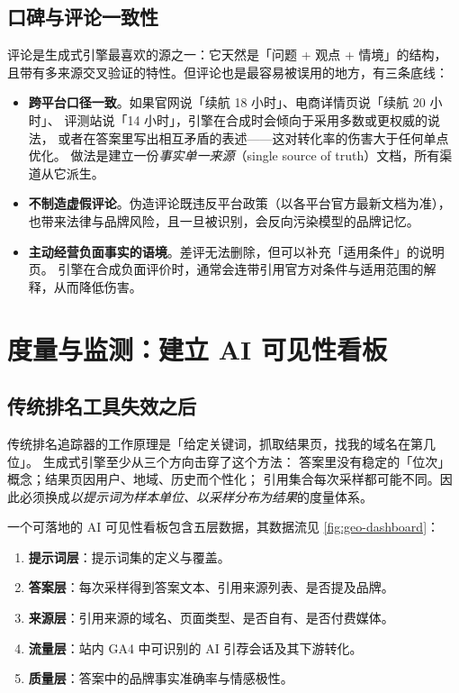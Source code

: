\subsection{口碑与评论一致性}

评论是生成式引擎最喜欢的源之一：它天然是「问题 + 观点 + 情境」的结构，
且带有多来源交叉验证的特性。但评论也是最容易被误用的地方，有三条底线：

\begin{itemize}
  \item \textbf{跨平台口径一致}。如果官网说「续航 18 小时」、电商详情页说「续航 20 小时」、
        评测站说「14 小时」，引擎在合成时会倾向于采用多数或更权威的说法，
        或者在答案里写出相互矛盾的表述——这对转化率的伤害大于任何单点优化。
        做法是建立一份\emph{事实单一来源}（single source of truth）文档，所有渠道从它派生。
  \item \textbf{不制造虚假评论}。伪造评论既违反平台政策（以各平台官方最新文档为准），
        也带来法律与品牌风险，且一旦被识别，会反向污染模型的品牌记忆。
  \item \textbf{主动经营负面事实的语境}。差评无法删除，但可以补充「适用条件」的说明页。
        引擎在合成负面评价时，通常会连带引用官方对条件与适用范围的解释，从而降低伤害。
\end{itemize}

\section{度量与监测：建立 AI 可见性看板}
\label{sec:geo-measurement}

\subsection{传统排名工具失效之后}

传统排名追踪器的工作原理是「给定关键词，抓取结果页，找我的域名在第几位」。
生成式引擎至少从三个方向击穿了这个方法：
答案里没有稳定的「位次」概念；结果页因用户、地域、历史而个性化；
引用集合每次采样都可能不同。因此必须换成\emph{以提示词为样本单位、以采样分布为结果}的度量体系。

一个可落地的 AI 可见性看板包含五层数据，其数据流见 \cref{fig:geo-dashboard}：

\begin{enumerate}
  \item \textbf{提示词层}：提示词集的定义与覆盖。
  \item \textbf{答案层}：每次采样得到答案文本、引用来源列表、是否提及品牌。
  \item \textbf{来源层}：引用来源的域名、页面类型、是否自有、是否付费媒体。
  \item \textbf{流量层}：站内 GA4 中可识别的 AI 引荐会话及其下游转化。
  \item \textbf{质量层}：答案中的品牌事实准确率与情感极性。
\end{enumerate}

